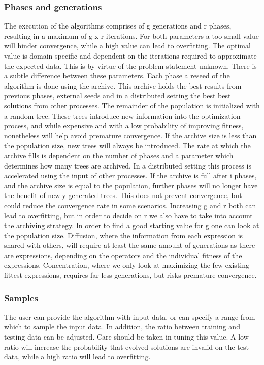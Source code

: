 \subsubsection{Phases and generations}
The execution of the algorithms comprises of g generations and r phases, resulting in a maximum of g x r iterations.
For both parameters a too small value will hinder convergence, while a high value can lead to overfitting. The optimal value is domain specific and dependent on the iterations required to approximate the expected data. This is by virtue of the problem statement unknown. There is a subtle difference between these parameters.
Each phase a reseed of the algorithm is done using the archive. This archive holds the best results from previous phases, external seeds and in a distributed setting the best best solutions from other processes.
The remainder of the population is initialized with a random tree. These trees introduce new information into the optimization process, and while expensive and with a low probability of improving fitness, nonetheless will help avoid premature convergence.
If the archive size is less than the population size, new trees will always be introduced. The rate at which the archive fills is dependent on the number of phases and a parameter which determines how many trees are archived. In a distributed setting this process is accelerated using the input of other processes. If the archive is full after i phases, and the archive size is equal to the population, further phases will no longer have the benefit of newly generated trees. This does not prevent convergence, but could reduce the convergence rate in some scenarios. Increasing g and r both can lead to overfitting, but in order to decide on r we also have to take into account the archiving strategy. In order to find a good starting value for g one can look at the population size.
Diffusion, where the information from each expression is shared with others, will require at least the same amount of generations as there are expressions, depending on the operators and the individual fitness of the expressions. Concentration, where we only look at maximizing the few existing fittest expressions, requires far less generations, but risks premature convergence.
\subsubsection{Samples}
The user can provide the algorithm with input data, or can specify a range from which to sample the input data. In addition, the ratio between training and testing data can be adjusted. Care should be taken in tuning this value. A low ratio will increase the probability that evolved solutions are invalid on the test data, while a high ratio will lead to overfitting.

